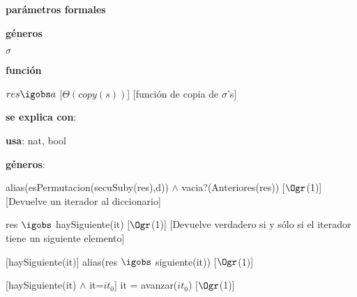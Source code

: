 \begin{Interfaz}

	\textbf{parámetros formales}\parindent\\
	\parbox{1.7cm}{\textbf{géneros}} $\sigma$\\
	\parbox[t]{1.7cm}{\textbf{función}}\parbox[t]{\textwidth-2\parindent-1.7cm}{%
	    	{$res \igobs a$}
		[$\Theta(copy(s))$]
		[función de copia de $\sigma$'s]
	}
	
	\textbf{se explica con}: 
	
	\textbf{usa}: nat, bool
	
	\textbf{géneros}: 
	
	
	{alias(esPermutacion(secuSuby(res),d)) $\land$ vacia?(Anteriores(res))}
	[$\Ogr$(1)]
	[Devuelve un iterador al diccionario]
	
	{res $\igobs$ haySiguiente(it)}	
	[$\Ogr$(1)]
	[Devuelve verdadero si y sólo si el iterador tiene un siguiente elemento]
	
	[haySiguiente(it)]
	{alias(res $\igobs$ siguiente(it))}
	[$\Ogr$(1)]
	
	[haySiguiente(it) $\land$ it=$it_0$]
	{it = avanzar($it_0$)}	
	[$\Ogr$(1)]

\end{Interfaz}